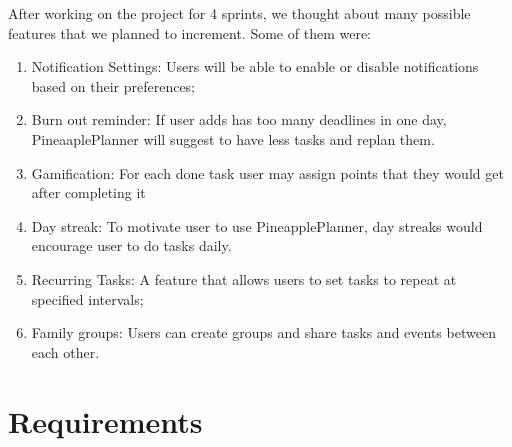\documentclass{article}
\begin{document}
After working on the project for 4 sprints, we thought about many possible features that we planned to increment. Some of them were:
\begin{enumerate}
  \item Notification Settings: Users will be able to enable or disable notifications based on their preferences;
  \item Burn out reminder: If user adds has too many deadlines in one day, PineaaplePlanner will suggest to have less tasks and replan them.
  \item Gamification: For each done task user may assign points that they would get after completing it
  \item Day streak: To motivate user to use PineapplePlanner, day streaks would encourage user to do tasks daily. 
  \item Recurring Tasks: A feature that allows users to set tasks to repeat at specified intervals;
  \item Family groups: Users can create groups and share tasks and events between each other.
\end{enumerate}


\section{Requirements}

\end{document}
